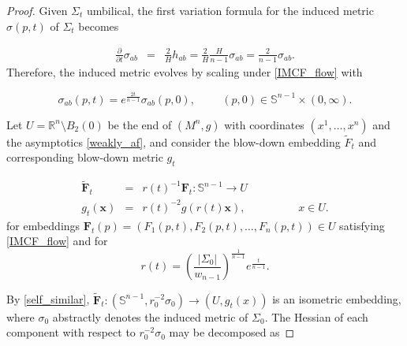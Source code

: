\documentclass[12pt,twoside]{article}
\theoremstyle{plain}
\theoremstyle{definition}
\theoremstyle{remark}
\renewcommand{\tilde}{\widetilde}
\numberwithin{equation}{section}
\begin{document}
\begin{proof}
 Given $\Sigma_{t}$ umbilical, the first variation formula for the induced metric $\sigma(p,t)$ of $\Sigma_{t}$ becomes

\begin{eqnarray*}
    \frac{\partial}{\partial t} \sigma_{ab} &=& \frac{2}{H} h_{ab} = \frac{2}{H} \frac{H}{n-1} \sigma_{ab} = \frac{2}{n-1} \sigma_{ab}.
\end{eqnarray*}
Therefore, the induced metric evolves by scaling under \eqref{IMCF_flow} with

\begin{equation} \label{self_similar}
\sigma_{ab}(p,t) = e^{\frac{2t}{n-1}} \sigma_{ab} (p,0), \hspace{1cm} (p,0) \in \mathbb{S}^{n-1} \times (0,\infty).    
\end{equation}

Let $U= \mathbb{R}^{n} \setminus B_2(0)$ be the end of $(M^{n},g)$ with coordinates $(x^{1},\dots,x^{n})$ and the asymptotics \eqref{weakly_af}, and consider the blow-down embedding $\widetilde{F}_{t}$ and corresponding blow-down metric $g_{t}$

\begin{eqnarray}
   \widetilde{\mathbf{F}}_{t} &=& r(t)^{-1} \mathbf{F}_{t}: \mathbb{S}^{n-1} \rightarrow U \\
   g_{t}(\mathbf{x})&=& r(t)^{-2}g(r(t)\mathbf{x}), \hspace{2cm} x \in U. \label{blow_down2}
\end{eqnarray}
for embeddings $\mathbf{F}_{t}(p)= \left(F_{1}(p,t),F_{2}(p,t),\dots,F_{n}(p,t) \right) \in U$ satisfying \eqref{IMCF_flow} and for
\begin{equation} \label{r}
    r(t)= \left( \frac{|\Sigma_{0}|}{w_{n-1}} \right)^{\frac{1}{n-1}} e^{\frac{t}{n-1}}.
\end{equation}


By \eqref{self_similar}, $\widetilde{\mathbf{F}}_{t}: \left( \mathbb{S}^{n-1}, r_{0}^{-2} \sigma_{0} \right) \rightarrow (U,g_{t}(x))$ is an isometric embedding, where $\sigma_{0}$ abstractly denotes the induced metric of $\Sigma_{0}$. The Hessian of each component with respect to $r_{0}^{-2} \sigma_{0}$ may be decomposed as


\end{proof}
\end{document}
